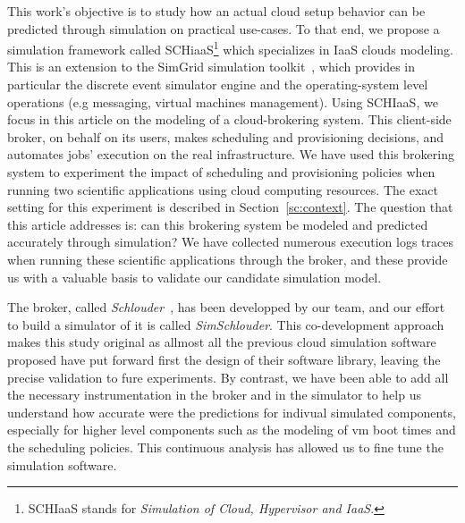 This work's  objective is  to study how  an actual cloud  setup behavior  can be
predicted through simulation on practical use-cases.   To that end, we propose a
simulation framework called SCHiaaS\footnote{SCHIaaS stands for \emph{Simulation
    of Cloud, Hypervisor and IaaS}.}  which specializes in IaaS clouds modeling.
This  is an  extension  to the  SimGrid simulation  toolkit~\cite{CasanovaLQ08},
which  provides  in particular  the  discrete  event  simulator engine  and  the
operating-system level operations (e.g  messaging, virtual machines management).
Using SCHIaaS,  we focus in  this article on  the modeling of  a cloud-brokering
system. This  client-side broker, on behalf  on its users, makes  scheduling and
provisioning   decisions,   and   automates   jobs'  execution   on   the   real
infrastructure. We have  used this brokering system to experiment  the impact of
scheduling and  provisioning policies  when running two  scientific applications
using  cloud computing  resources.  The  exact  setting for  this experiment  is
described in Section~\ref{sc:context}. The  question that this article addresses
is:  can this  brokering  system  be modeled  and  predicted accurately  through
simulation? We have collected numerous  execution logs traces when running these
scientific applications through the broker, and these provide us with a valuable
basis to validate our candidate simulation model.

The broker,  called \textit{Schlouder}~\cite{Michon17},  has been  developped by
our   team,  and   our  effort   to   build  a   simulator  of   it  is   called
\textit{SimSchlouder}.  This  co-development approach makes this  study original
as allmost all the previous cloud  simulation software proposed have put forward
first the  design of their software  library, leaving the precise  validation to
fure  experiments.  By  contrast, we  have been  able to  add all  the necessary
instrumentation in  the broker and  in the simulator  to help us  understand how
accurate were the predictions for  indivual simulated components, especially for
higher  level components  such as  the modeling  of \ac{vm}  boot times  and the
scheduling policies. This continuous analysis has allowed us to fine tune the
simulation software. 


